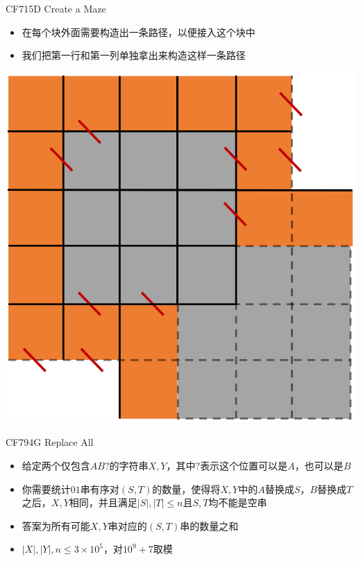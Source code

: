 \documentclass{beamer}
\begin{document}
\begin{frame}{CF715D Create a Maze}
    \begin{itemize}
        \item 在每个块外面需要构造出一条路径，以便接入这个块中
        \item 我们把第一行和第一列单独拿出来构造这样一条路径
    \end{itemize}
    \begin{center}
        \includegraphics[scale = 0.4]{3.png}
    \end{center}
\end{frame}

\begin{frame}{CF794G Replace All}
    \begin{itemize}
        \item 给定两个仅包含$AB?$的字符串$X, Y$，其中$?$表示这个位置可以是$A$，也可以是$B$
        \item 你需要统计$01$串有序对$(S, T)$的数量，使得将$X, Y$中的$A$替换成$S$，$B$替换成$T$之后，$X, Y$相同，并且满足$|S|, |T|\leq n$且$S, T$均不能是空串
        \item 答案为所有可能$X, Y$串对应的$(S, T)$串的数量之和
        \item $|X|, |Y|, n\leq 3\times 10^5$，对$10^9 + 7$取模
    \end{itemize}
\end{frame}
\end{document}

